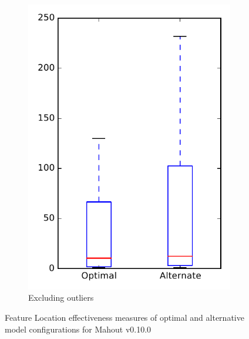 \begin{figure}
\begin{subfigure}{.4\textwidth}
        \includegraphics[height=0.4\textheight]{figures/combo/flt_rq1_mahout_no_outlier}
        \caption{Excluding outliers}\label{fig:combo:flt:rq1:mahout_no_outlier}
    \end{subfigure}
\caption{Feature Location effectiveness measures of optimal and alternative model configurations for Mahout v0.10.0}
\label{fig:combo:flt:rq1:mahout}
\end{figure}
